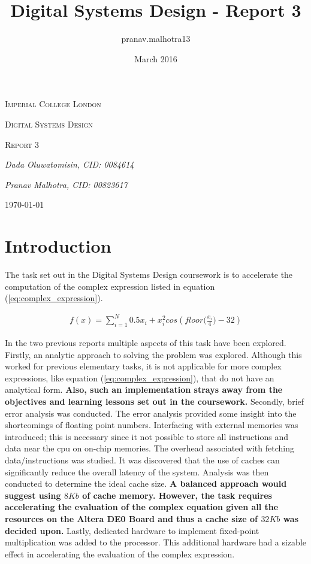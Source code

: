 \documentclass{article}
\title{Digital Systems Design - Report 3}
\author{pranav.malhotra13 }
\date{March 2016}
\begin{document}
\begin{titlepage}
	\centering
	{\scshape\LARGE Imperial College London \par}
	\vspace{2cm}
	{\scshape\Large Digital Systems Design \par}
	\vspace{1cm}
	{\scshape\Large Report 3 \par}
	\vspace{2.5cm}
	{\Large\itshape Dada Oluwatomisin, CID: 0084614 \par}
	\vspace{1.0cm}
	{\Large\itshape Pranav Malhotra, CID: 00823617 \par}
	\vfill
	{\large \today\par}
\end{titlepage}

\tableofcontents
\newpage
\section{Introduction}
The task set out in the Digital Systems Design coursework is to accelerate the computation of the complex expression listed in equation (\ref{eq:complex_expression}).

\begin{align}
    f(x) = \sum_{i=1}^{N} 0.5x_{i} + x_{i}^{2}cos(floor\big(\frac{x_{i}}{4}\big)-32)\label{eq:complex_expression}
\end{align}


In the two previous reports multiple aspects of this task have been explored.\\ 
 
Firstly, an analytic approach to solving the problem was explored. Although this worked for previous elementary tasks, it is not applicable for more complex expressions, like equation (\ref{eq:complex_expression}), that do not have an analytical form. \textbf{Also, such an implementation strays away from the objectives and learning lessons set out in the coursework.} Secondly, brief error analysis was conducted. The error analysis provided some insight into the shortcomings of floating point numbers. Interfacing with external memories was introduced; this is necessary since it not possible to store all instructions and data near the cpu on on-chip memories. The overhead associated with fetching data/instructions was studied. It was discovered that the use of caches can significantly reduce the overall latency of the system. Analysis was then conducted to determine the ideal cache size. \textbf{A balanced approach would suggest using $8Kb$ of cache memory. However, the task requires accelerating the evaluation of the complex equation given all the resources on the Altera DE0 Board and thus a cache size of $32Kb$ was decided upon.} Lastly, dedicated hardware to implement fixed-point multiplication was added to the processor. This additional hardware had a sizable effect in accelerating the evaluation of the complex expression.\\
\end{document}
